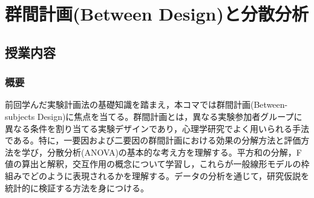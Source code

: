 \section{群間計画(Between Design)と分散分析}
\label{b18_BetweenDesign}

\subsection{授業内容}
\subsubsection{概要}
前回学んだ実験計画法の基礎知識を踏まえ，本コマでは群間計画(Between-subjects Design)に焦点を当てる。群間計画とは，異なる実験参加者グループに異なる条件を割り当てる実験デザインであり，心理学研究でよく用いられる手法である。特に，一要因および二要因の群間計画における効果の分解方法と評価方法を学び，分散分析(ANOVA)の基本的な考え方を理解する。平方和の分解，F値の算出と解釈，交互作用の概念について学習し，これらが一般線形モデルの枠組みでどのように表現されるかを理解する。データの分析を通じて，研究仮説を統計的に検証する方法を身につける。

